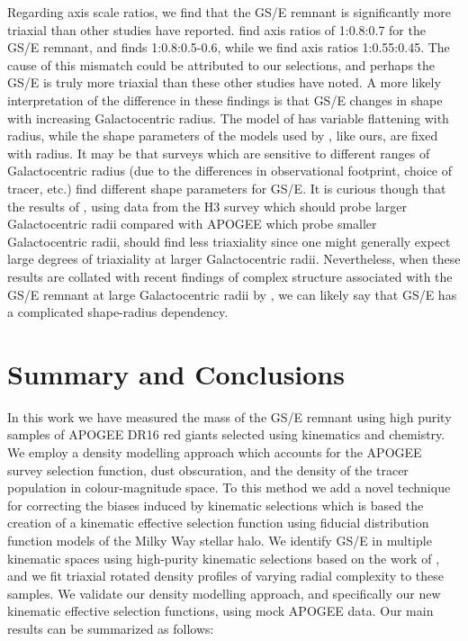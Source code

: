 Regarding axis scale ratios, we find that the GS/E remnant is significantly more triaxial than other studies have reported. \textcite{han22} find axis ratios of 1:0.8:0.7 for the GS/E remnant, and \textcite{iorio18} finds 1:0.8:0.5-0.6, while we find axis ratios 1:0.55:0.45. The cause of this mismatch could be attributed to our selections, and perhaps the GS/E is truly more triaxial than these other studies have noted. A more likely interpretation of the difference in these findings is that GS/E changes in shape with increasing Galactocentric radius. The model of \textcite{iorio18} has variable flattening with radius, while the shape parameters of the models used by \textcite{han22}, like ours, are fixed with radius. It may be that surveys which are sensitive to different ranges of Galactocentric radius (due to the differences in observational footprint, choice of tracer, etc.) find different shape parameters for GS/E. It is curious though that the results of \textcite{han22}, using data from the H3 survey which should probe larger Galactocentric radii compared with APOGEE which probe smaller Galactocentric radii, should find less triaxiality since one might generally expect large degrees of triaxiality at larger Galactocentric radii. Nevertheless, when these results are collated with recent findings of complex structure associated with the GS/E remnant at large Galactocentric radii by \textcite{chandra23}, we can likely say that GS/E has a complicated shape-radius dependency.


\section{Summary and Conclusions}
\label{ch3:sec:summary-conclusions}

In this work we have measured the mass of the GS/E remnant using high purity samples of APOGEE DR16 red giants selected using kinematics and chemistry. We employ a density modelling approach which accounts for the APOGEE survey selection function, dust obscuration, and the density of the tracer population in colour-magnitude space. To this method we add a novel technique for correcting the biases induced by kinematic selections which is based the creation of a kinematic effective selection function using fiducial distribution function models of the Milky Way stellar halo. We identify GS/E in multiple kinematic spaces using high-purity kinematic selections based on the work of \cite{lane22}, and we fit triaxial rotated density profiles of varying radial complexity to these samples. We validate our density modelling approach, and specifically our new kinematic effective selection functions, using mock APOGEE data. Our main results can be summarized as follows:

